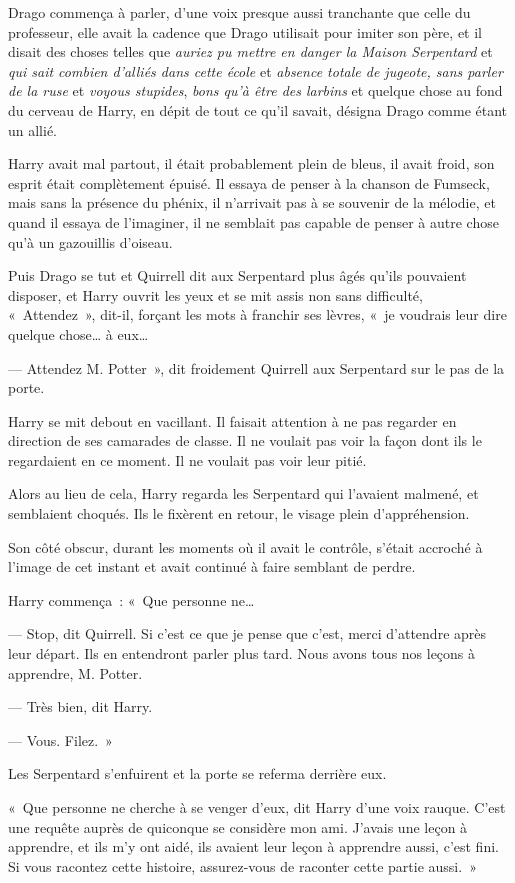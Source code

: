 Drago commença à parler, d'une voix presque aussi tranchante que celle du professeur, elle avait la cadence que Drago utilisait pour imiter son père, et il disait des choses telles que \emph{auriez pu mettre en danger la Maison Serpentard} et \emph{qui sait combien d'alliés dans cette école} et \emph{absence totale de jugeote, sans parler de la ruse} et \emph{voyous stupides}, \emph{bons qu'à être des larbins} et quelque chose au fond du cerveau de Harry, en dépit de tout ce qu'il savait, désigna Drago comme étant un allié.

Harry avait mal partout, il était probablement plein de bleus, il avait froid, son esprit était complètement épuisé.
Il essaya de penser à la chanson de Fumseck, mais sans la présence du phénix, il n'arrivait pas à se souvenir de la mélodie, et quand il essaya de l'imaginer, il ne semblait pas capable de penser à autre chose qu'à un gazouillis d'oiseau.

Puis Drago se tut et Quirrell dit aux Serpentard plus âgés qu'ils pouvaient disposer, et Harry ouvrit les yeux et se mit assis non sans difficulté,
«~Attendez~», dit-il, forçant les mots à franchir ses lèvres, «~je voudrais leur dire quelque chose… à eux…

--- Attendez M. Potter~», dit froidement Quirrell aux Serpentard sur le pas de la porte.

Harry se mit debout en vacillant.
Il faisait attention à ne pas regarder en direction de ses camarades de classe.
Il ne voulait pas voir la façon dont ils le regardaient en ce moment.
Il ne voulait pas voir leur pitié.

Alors au lieu de cela, Harry regarda les Serpentard qui l'avaient malmené, et semblaient choqués.
Ils le fixèrent en retour, le visage plein d'appréhension.

Son côté obscur, durant les moments où il avait le contrôle, s'était accroché à l'image de cet instant et avait continué à faire semblant de perdre.

Harry commença~: «~Que personne ne…

--- Stop, dit Quirrell.
Si c'est ce que je pense que c'est, merci d'attendre après leur départ.
Ils en entendront parler plus tard.
Nous avons tous nos leçons à apprendre, M. Potter.

--- Très bien, dit Harry.

--- Vous. Filez.~»

Les Serpentard s'enfuirent et la porte se referma derrière eux.

«~Que personne ne cherche à se venger d'eux, dit Harry d'une voix rauque.
C'est une requête auprès de quiconque se considère mon ami.
J'avais une leçon à apprendre, et ils m'y ont aidé, ils avaient leur leçon à apprendre aussi, c'est fini.
Si vous racontez cette histoire, assurez-vous de raconter cette partie aussi.~»


